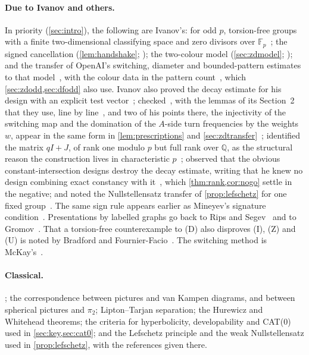 \documentclass[11pt]{article}
\theoremstyle{definition}
\theoremstyle{plain}
\newcommand{\F}{\mathbb{F}}
\newcommand{\Q}{\mathbb{Q}}
\begin{document}
\paragraph{Due to Ivanov and others.} In priority (\cref{sec:intro}), the following are Ivanov's: for odd $p$, torsion-free groups with a finite two-dimensional classifying space and zero divisors over $\F_p$~\cite[Thm.~1.1]{Ivanov2026}; the signed cancellation (\cref{lem:handshake}; \cite[Lemma~2.2]{Ivanov2026}); the two-colour model (\cref{sec:zdmodel}; \cite[Construction~4.1]{Ivanov2026}); and the transfer of OpenAI's switching, diameter and bounded-pattern estimates to that model~\cite[Lemmas~4.2 and~4.4, Prop.~6.1]{Ivanov2026}, with the colour data in the pattern count~\cite[\S6.1]{Ivanov2026}, which \cref{sec:zdodd,sec:dfodd} also use. Ivanov also proved the decay estimate for his design with an explicit test vector~\cite[Prop.~5.3]{Ivanov2026}; checked~\cite[\S\S3--5]{OAI196}, with the lemmas of its Section~2 that they use, line by line~\cite[Appendix~A]{Ivanov2026}, and two of his points there, the injectivity of the switching map and the domination of the $A$-side turn frequencies by the weights $w$, appear in the same form in \cref{lem:prescriptions} and \cref{sec:zdtransfer}~\cite[Remarks~A.1 and~A.3]{Ivanov2026}; identified the matrix $qI+J$, of rank one modulo $p$ but full rank over $\Q$, as the structural reason the construction lives in characteristic $p$~\cite[\S\S1.5 and~3]{Ivanov2026}; observed that the obvious constant-intersection designs destroy the decay estimate, writing that he knew no design combining exact constancy with it~\cite[\S8.2]{Ivanov2026}, which \cref{thm:rank,cor:nogo} settle in the negative; and noted the Nullstellensatz transfer of \cref{prop:lefschetz} for one fixed group~\cite[\S8.3]{Ivanov2026}. The same sign rule appears earlier as Mineyev's signature condition~\cite[\S2.2]{Mineyev2024}. Presentations by labelled graphs go back to Rips and Segev~\cite{RipsSegev1987} and to Gromov~\cite{Gromov2003}. That a torsion-free counterexample to (D) also disproves (I), (Z) and (U) is noted by Bradford and Fournier-Facio~\cite[\S1]{BFF2024}. The switching method is McKay's~\cite{McKay1981,McKayWormald1991}.

\paragraph{Classical.} ; the correspondence between pictures and van Kampen diagrams, and between spherical pictures and $\pi_2$; Lipton--Tarjan separation; the Hurewicz and Whitehead theorems; the criteria for hyperbolicity, developability and CAT(0) used in \cref{sec:key,sec:cat0}; and the Lefschetz principle and the weak Nullstellensatz used in \cref{prop:lefschetz}, with the references given there.
\end{document}

